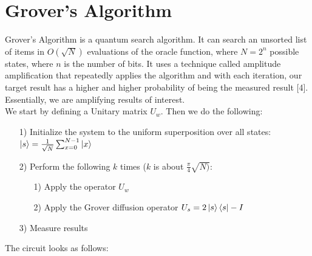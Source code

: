 \documentclass[11pt]{article} %
\begin{document}
\section{Grover's Algorithm}{}
Grover's Algorithm is a quantum search algorithm. It can search an unsorted list of items in $O(\sqrt{N})$ evaluations of the oracle function, where $ N = 2^{n}$ possible states, where $n$ is the number of bits. It uses a technique called amplitude amplification that repeatedly applies the algorithm and with each iteration, our target result has a higher and higher probability of being the measured result [4]. Essentially, we are amplifying results of interest.\\

\noindent We start by defining a Unitary matrix $U_w$. Then we do the following:

\begin{itemize}

\item[1)] Initialize the system to the uniform superposition over all states:\\

$ \ket{s} = \frac{1}{\sqrt{N}}  \sum_{x = 0}^{N - 1} \ket{x}$

\item[2)] Perform the following $k$ times ($k$ is about $\frac{\pi}{4} \sqrt{N)}$:

\begin{itemize}
\item[1)] Apply the operator $U_w$
\item[2)] Apply the Grover diffusion operator $U_s = 2 \ket{s} \bra{s} - I$
\end{itemize}
\item[3)] Measure results
\end{itemize}

The circuit looks as follows:\\
\end{document}
